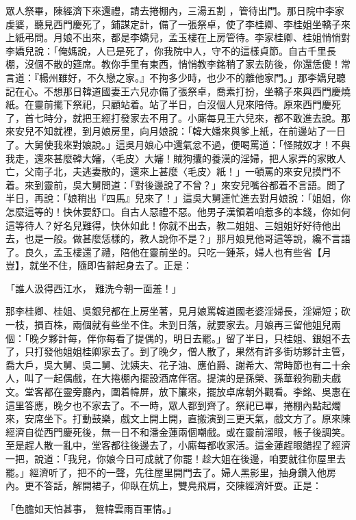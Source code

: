 眾人祭畢，陳經濟下來還禮，請去捲棚內，三湯五割 ，管待出門。那日院中李家虔婆，聽見西門慶死了，鋪謀定計，備了一張祭卓，使了李桂卿、李桂姐坐轎子來上紙弔問。月娘不出來，都是李嬌兒，孟玉樓在上房管待。李家桂卿、桂姐悄悄對李嬌兒說：「俺媽說，人已是死了，你我院中人，守不的這樣貞節。自古千里長棚，沒個不散的筵席。教你手里有東西，悄悄教李銘稍了家去防後，你還恁傻！常言道：『楊州雖好，不久戀之家。』不拘多少時，也少不的離他家門。」那李嬌兒聽記在心。不想那日韓道國妻王六兒亦備了張祭卓，喬素打扮，坐轎子來與西門慶燒紙。在靈前擺下祭祀，只顧站着。站了半日，白沒個人兒來陪侍。原來西門慶死了，首七時分，就把王經打發家去不用了。小廝每見王六兒來，都不敢進去說。那來安兒不知就裡，到月娘房里，向月娘說：「韓大嬏來與爹上紙，在前邊站了一日了。大舅使我來對娘說。」這吳月娘心中還氣忿不過，便喝罵道：「怪賊奴才！不與我走，還來甚麼韓大嬸，〈毛皮〉大嬸！賊狗攮的養漢的淫婦，把人家弄的家敗人亡，父南子北，夫逃妻散的，還來上甚麼〈毛皮〉紙！」一頓罵的來安兒摸門不着。來到靈前，吳大舅問道：「對後邊說了不曾？」來安兒嘴谷都着不言語。問了半日，再說：「娘稍出『四馬』兒來了！」這吳大舅連忙進去對月娘說：「姐姐，你怎麼這等的！快休要舒口。自古人惡禮不惡。他男子漢領着咱惹多的本錢，你如何這等待人？好名兒難得，快休如此！你就不出去，教二姐姐、三姐姐好好待他出去，也是一般。做甚麼恁樣的，教人說你不是？」那月娘見他哥這等說，纔不言語了。良久，孟玉樓還了禮，陪他在靈前坐的。只吃一鍾茶，婦人也有些省【月豈】，就坐不住，隨即告辭起身去了。正是：

「誰人汲得西江水，  難洗今朝一面羞！」

那李桂卿、桂姐、吳銀兒都在上房坐著，見月娘罵韓道國老婆淫婦長，淫婦短；砍一枝，損百株，兩個就有些坐不住。未到日落，就要家去。月娘再三留他姐兒兩個：「晚夕夥計每，伴你每看了提偶的，明日去罷。」留了半日，只桂姐、銀姐不去了，只打發他姐姐桂卿家去了。到了晚夕，僧人散了，果然有許多街坊夥計主管，喬大戶，吳大舅、吳二舅、沈姨夫、花子油、應伯爵、謝希大、常時節也有二十余人，叫了一起偶戲，在大捲棚內擺設酒席伴宿。提演的是孫榮、孫華殺狗勸夫戲文。堂客都在靈旁廳內，圍着幃屏，放下簾來，擺放卓席朝外觀看。李銘、吳惠在這里答應，晚夕也不家去了。不一時，眾人都到齊了。祭祀已畢，捲棚內點起燭來，安席坐下。打動鼓樂，戲文上開上開，直搬演到三更天氣，戲文方了。原來陳經濟自從西門慶死後，無一日不和潘金蓮兩個嘲戲。或在靈前溜眼，帳子後調笑。至是趕人散一亂中，堂客都往後邊去了，小廝每都收家活。這金蓮趕眼錯捏了經濟一把，說道：「我兒，你娘今日可成就了你罷！趁大姐在後邊，咱要就往你屋里去罷。」經濟听了，把不的一聲，先往屋里開門去了。婦人黑影里，抽身鑽入他房內。更不答話，解開裙子，仰臥在炕上，雙鳧飛肩，交陳經濟奸耍。正是：

「色膽如天怕甚事，  鴛幃雲雨百軍情。」

